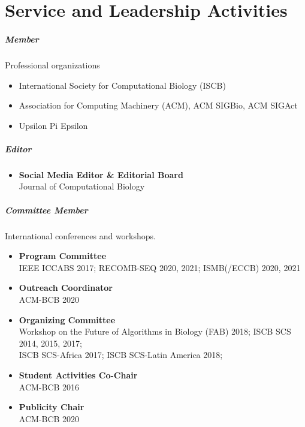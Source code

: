 \documentclass[10pt,letterpaper]{article}
\begin{document}
\section*{Service and Leadership Activities}




\subparagraph{Member} Professional organizations
\begin{itemize}
\item International Society for Computational Biology (ISCB)
\item Association for Computing Machinery (ACM), ACM SIGBio, ACM SIGAct
\item Upsilon Pi Epsilon
\end{itemize}

\subparagraph{Editor} 
\begin{itemize}[leftmargin=!,labelindent=5pt,itemindent=-15pt]
	\item \textbf{Social Media Editor \& Editorial Board}\\
	Journal of Computational Biology
\end{itemize}

\subparagraph{Committee Member} International conferences and workshops.
\begin{itemize}[leftmargin=!,labelindent=5pt,itemindent=-15pt]
    \item \textbf{Program Committee} \\ IEEE ICCABS 2017; RECOMB-SEQ 2020, 2021; ISMB(/ECCB) 2020, 2021
    \item \textbf{Outreach Coordinator} \\ ACM-BCB 2020
    \item \textbf{Organizing Committee} \\
    Workshop on the Future of Algorithms in Biology (FAB) 2018; 
    ISCB SCS 2014, 2015, 2017;  \\
    ISCB SCS\nobreakdash-Africa 2017; 
    ISCB SCS-Latin America 2018;  
    \item \textbf{Student Activities Co-Chair} \\ ACM-BCB 2016
    \item \textbf{Publicity Chair} \\ ACM-BCB 2020
\end{itemize}
\end{document}
